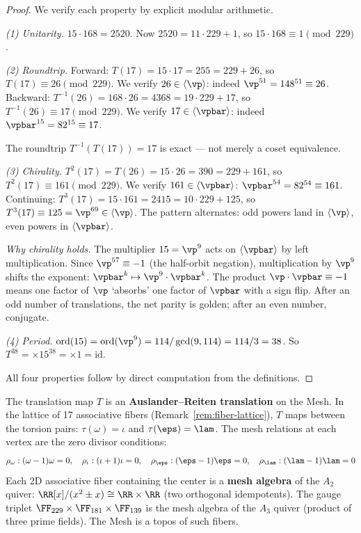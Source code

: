 \begin{proof}
We verify each property by explicit modular arithmetic.

\emph{(1) Unitarity.} $15 \cdot 168 = 2520$. Now $2520 = 11 \cdot 229 + 1$, so $15 \cdot 168 \equiv 1 \pmod{229}$.

\emph{(2) Roundtrip.} Forward: $T(17) = 15 \cdot 17 = 255 = 229 + 26$, so $T(17) \equiv 26 \pmod{229}$. We verify $26 \in \langle\vp\rangle$: indeed $\vp^{51} = 148^{51} \equiv 26$. Backward: $T^{-1}(26) = 168 \cdot 26 = 4368 = 19 \cdot 229 + 17$, so $T^{-1}(26) \equiv 17 \pmod{229}$. We verify $17 \in \langle\vpbar\rangle$: indeed $\vpbar^{15} = 82^{15} \equiv 17$.

The roundtrip $T^{-1}(T(17)) = 17$ is exact --- not merely a coset equivalence.

\emph{(3) Chirality.} $T^2(17) = T(26) = 15 \cdot 26 = 390 = 229 + 161$, so $T^2(17) \equiv 161 \pmod{229}$. We verify $161 \in \langle\vpbar\rangle$: $\vpbar^{54} = 82^{54} \equiv 161$. Continuing: $T^3(17) = 15 \cdot 161 = 2415 = 10 \cdot 229 + 125$, so $T^3(17) \equiv 125 = \vp^{69} \in \langle\vp\rangle$. The pattern alternates: odd powers land in $\langle\vp\rangle$, even powers in $\langle\vpbar\rangle$.

\emph{Why chirality holds.} The multiplier $15 = \vp^9$ acts on $\langle\vpbar\rangle$ by left multiplication. Since $\vp^{57} \equiv -1$ (the half-orbit negation), multiplication by $\vp^9$ shifts the exponent: $\vpbar^k \mapsto \vp^9 \cdot \vpbar^k$. The product $\vp \cdot \vpbar \equiv -1$ means one factor of $\vp$ `absorbs' one factor of $\vpbar$ with a sign flip. After an odd number of translations, the net parity is golden; after an even number, conjugate.

\emph{(4) Period.} $\mathrm{ord}(15) = \mathrm{ord}(\vp^9) = 114 / \gcd(9, 114) = 114/3 = 38$. So $T^{38} = \times 15^{38} = \times 1 = \mathrm{id}$.

All four properties follow by direct computation from the definitions. \qedhere
\end{proof}

\begin{remark}
The translation map $T$ is an \textbf{Auslander--Reiten translation} on the Mesh. In the lattice of 17 associative fibers (Remark~\ref{rem:fiber-lattice}), $T$ maps between the torsion pairs: $\tau(\omega) = \iota$ and $\tau(\eps) = \lam$. The mesh relations at each vertex are the zero divisor conditions:
$$\rho_\omega : (\omega - 1)\omega = 0, \quad \rho_\iota : (\iota + 1)\iota = 0, \quad \rho_\eps : (\eps - 1)\eps = 0, \quad \rho_\lam : (\lam - 1)\lam = 0$$
Each 2D associative fiber containing the center is a \textbf{mesh algebra} of the $A_2$ quiver: $\RR[x]/(x^2 \pm x) \cong \RR \times \RR$ (two orthogonal idempotents). The gauge triplet $\FF_{229} \times \FF_{181} \times \FF_{139}$ is the mesh algebra of the $A_3$ quiver (product of three prime fields). The Mesh is a topos of such fibers.
\end{remark}

